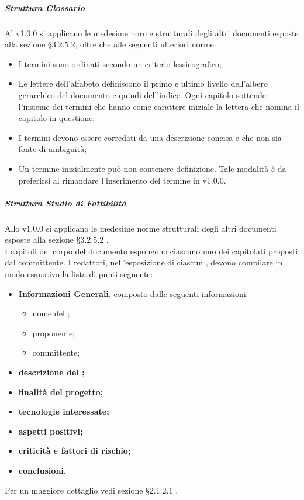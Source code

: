                 \subparagraph{Struttura Glossario}
                    Al  v1.0.0 si applicano le medesime norme strutturali degli altri documenti esposte alla sezione §3.2.5.2, oltre che alle seguenti ulteriori norme:\\
                    \begin{itemize}
                        \item I  termini sono ordinati secondo un criterio lessicografico; 
                        \item Le lettere dell'alfabeto definiscono il primo e ultimo livello dell’albero gerarchico del documento e quindi dell’indice. Ogni capitolo sottende l’insieme dei termini che hanno come carattere iniziale la lettera che nomina il capitolo in questione; 
                        \item I termini devono essere corredati da una descrizione concisa e che non sia fonte di ambiguità; 
                        \item Un termine inizialmente può non contenere definizione. Tale modalità è da preferirsi al rimandare l’inserimento del termine in  v1.0.0.
                    \end{itemize}
                \subparagraph{Struttura Studio di Fattibilità}
                    Allo  v1.0.0 si applicano le medesime norme strutturali degli altri documenti esposte alla sezione §3.2.5.2 . \\
                    I capitoli del corpo del documento espongono ciascuno uno dei capitolati proposti dal committente. I redattori, nell’esposizione di ciascun , devono compilare in modo esaustivo la lista di punti seguente: 
                    \begin{itemize}
                        \item\textbf{Informazioni Generali}, composto dalle seguenti informazioni:
                            \begin{itemize}
                                \item nome del ;
                                \item proponente;
                                \item committente;
                            \end{itemize}
                        \item\textbf{descrizione del ;}
                        \item\textbf{finalità del progetto;}
                        \item\textbf{tecnologie interessate;}
                        \item\textbf{aspetti positivi;}
                        \item\textbf{criticità e fattori di rischio;}
                        \item\textbf{conclusioni.}
                    \end{itemize}
                    Per un maggiore dettaglio vedi sezione §2.1.2.1 .
